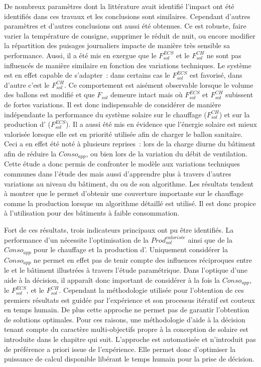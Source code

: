 De nombreux paramètres dont la littérature avait identifié l’impact ont été identifiés dans
ces travaux et les conclusions sont similaires. Cependant d’autres paramètres et d’autres
conclusions ont aussi été obtenues. Ce  est robuste, faire varier la température de
consigne, supprimer le réduit de nuit, ou encore modifier la répartition des puisages
journaliers impacte de manière très sensible sa performance. Aussi, il a été mis en exergue que
le $F_{sol}^{ECS}$ et le $F_{sol}^{CH}$ ne sont pas influencés de manière similaire en
fonction des variations techniques. Le système est en effet capable de s’adapter~: dans
certains cas le $F_{sol}^{ECS}$ est favorisé, dans d’autre c’est le $F_{sol}^{CH}$. Ce
comportement est aisément observable lorsque le volume des ballons est modifié et que
$F_{sol}$ demeure intact mais où $F_{sol}^{ECS}$ et $F_{sol}^{CH}$ subissent de fortes
variations. Il est donc indispensable de considérer de manière indépendante la performance
du système solaire sur le chauffage ($F_{sol}^{CH}$) et sur la production d’
($F_{sol}^{ECS}$). Il a aussi été mis en évidence que l’énergie solaire est mieux
valorisée lorsque elle est en priorité utilisée afin de charger le ballon
sanitaire. Ceci a en effet été noté à plusieurs reprises~: lors de la charge diurne du
bâtiment afin de réduire la $Conso_{app}$, ou bien lors de la variation du débit de
ventilation. Cette étude a donc permis de confronter le modèle aux variations techniques
communes dans l’étude des  mais aussi d’apprendre plus à travers d’autres variations
au niveau du bâtiment, du  ou de son algorithme. Les résultats tendent à
montrer que le  permet d’obtenir une couverture importante sur le chauffage comme la
production  lorsque un algorithme détaillé est utilisé. Il est donc propice à
l’utilisation pour des bâtiments à faible consommation.

Fort de ces résultats, trois indicateurs principaux ont pu être identifiés. La performance
d’un  nécessite l’optimisation de la $Prod_{sol}^{valorisée}$ ainsi que de la
$Conso_{app}$ pour le chauffage et la production d’. Uniquement considérer la
$Conso_{app}$ ne permet en effet pas de tenir compte des influences réciproques entre le
 et le bâtiment illustrées à travers l’étude paramétrique. Dans l’optique d’une
aide à la décision, il apparaît donc important de considérer à la fois la $Conso_{app}$,
le $F_{sol}^{ECS}$, et le $F_{sol}^{CH}$. Cependant la méthodologie utilisée pour
l’obtention de ces premiers résultats est guidée par l’expérience et son processus
itératif est couteux en temps humain. De plus cette approche ne permet pas de garantir
l’obtention de solutions optimales. Pour ces raisons, une méthodologie d’aide à la
décision tenant compte du caractère multi-objectifs propre à la conception de 
solaire est introduite dans le chapitre qui suit. L’approche est automatisée et
n’introduit pas de préférence a priori issue de l’expérience. Elle permet donc d’optimiser
la puissance de calcul disponible libérant le temps humain pour la prise de décision.
